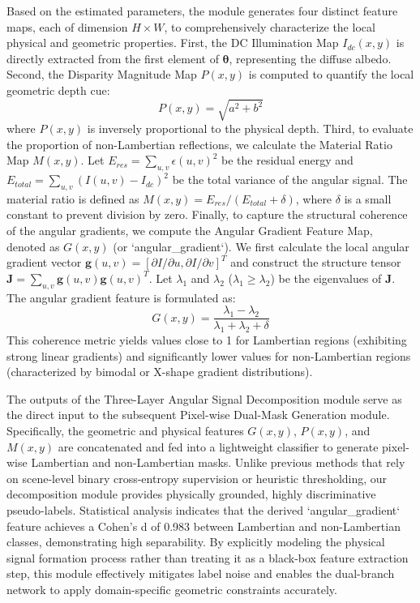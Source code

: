 Based on the estimated parameters, the module generates four distinct feature maps, each of dimension $H \times W$, to comprehensively characterize the local physical and geometric properties. First, the DC Illumination Map $I_{dc}(x,y)$ is directly extracted from the first element of $\boldsymbol{\theta}$, representing the diffuse albedo. Second, the Disparity Magnitude Map $P(x,y)$ is computed to quantify the local geometric depth cue:
\begin{equation}
\label{eq:eq6}
P(x,y) = \sqrt{a^2 + b^2}
\end{equation}
where $P(x,y)$ is inversely proportional to the physical depth. Third, to evaluate the proportion of non-Lambertian reflections, we calculate the Material Ratio Map $M(x,y)$. Let $E_{res} = \sum_{u,v} \epsilon(u,v)^2$ be the residual energy and $E_{total} = \sum_{u,v} (I(u,v) - I_{dc})^2$ be the total variance of the angular signal. The material ratio is defined as $M(x,y) = E_{res} / (E_{total} + \delta)$, where $\delta$ is a small constant to prevent division by zero. Finally, to capture the structural coherence of the angular gradients, we compute the Angular Gradient Feature Map, denoted as $G(x,y)$ (or `angular_gradient`). We first calculate the local angular gradient vector $\mathbf{g}(u,v) = [\partial I/\partial u, \partial I/\partial v]^T$ and construct the structure tensor $\mathbf{J} = \sum_{u,v} \mathbf{g}(u,v) \mathbf{g}(u,v)^T$. Let $\lambda_1$ and $\lambda_2$ ($\lambda_1 \ge \lambda_2$) be the eigenvalues of $\mathbf{J}$. The angular gradient feature is formulated as:
\begin{equation}
\label{eq:eq7}
G(x,y) = \frac{\lambda_1 - \lambda_2}{\lambda_1 + \lambda_2 + \delta}
\end{equation}
This coherence metric yields values close to 1 for Lambertian regions (exhibiting strong linear gradients) and significantly lower values for non-Lambertian regions (characterized by bimodal or X-shape gradient distributions).

The outputs of the Three-Layer Angular Signal Decomposition module serve as the direct input to the subsequent Pixel-wise Dual-Mask Generation module. Specifically, the geometric and physical features $G(x,y)$, $P(x,y)$, and $M(x,y)$ are concatenated and fed into a lightweight classifier to generate pixel-wise Lambertian and non-Lambertian masks. Unlike previous methods that rely on scene-level binary cross-entropy supervision or heuristic thresholding, our decomposition module provides physically grounded, highly discriminative pseudo-labels. Statistical analysis indicates that the derived `angular_gradient` feature achieves a Cohen's d of 0.983 between Lambertian and non-Lambertian classes, demonstrating high separability. By explicitly modeling the physical signal formation process rather than treating it as a black-box feature extraction step, this module effectively mitigates label noise and enables the dual-branch network to apply domain-specific geometric constraints accurately.

